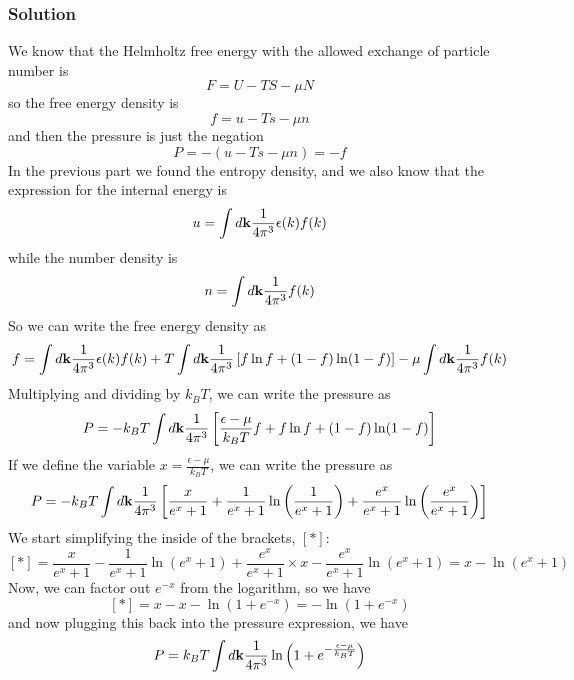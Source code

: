 \documentclass[12pt]{article}
\begin{document}
\subsubsection{Solution}
We know that the Helmholtz free energy with the allowed exchange of particle number is
\begin{equation}
    F = U - TS - \mu N
\end{equation}
so the free energy density is
\begin{equation}
    f = u - Ts - \mu n
\end{equation}
and then the pressure is just the negation
\begin{equation}
    P = -\left( u - Ts - \mu n \right) = -f
\end{equation}
In the previous part we found the entropy density, and we also know that the expression for the internal energy is
\begin{equation}
    u = \int d \vb{k} \frac{1}{4\pi^3} \epsilon(k) f(k)
\end{equation}
while the number density is
\begin{equation}
    n = \int d \vb{k} \frac{1}{4\pi^3} f(k)
\end{equation}
So we can write the free energy density as
\begin{equation}
    f = \int d \vb{k} \frac{1}{4\pi^3} \epsilon(k) f(k) + T \int d \vb{k} \frac{1}{4\pi^3} \left[ f \ln f + (1 - f) \ln (1 - f) \right] - \mu \int d \vb{k} \frac{1}{4\pi^3} f(k)
\end{equation}
Multiplying and dividing by \( k_B T \), we can write the pressure as
\begin{equation}
    P = -k_B T \int d \vb{k} \frac{1}{4\pi^3} \left[ \frac{\epsilon - \mu}{k_B T} f + f \ln f + (1 - f) \ln (1 - f) \right]
\end{equation}
If we define the variable \( x = \frac{\epsilon - \mu}{k_B T} \), we can write the pressure as
\begin{equation}
    P = -k_B T \int d \vb{k} \frac{1}{4\pi^3} \left[ \frac{x}{e^x + 1} + \frac{1}{e^x + 1} \ln \left( \frac{1}{e^x + 1} \right) + \frac{e^x}{e^x + 1} \ln \left( \frac{e^x}{e^x + 1} \right) \right]
\end{equation}
We start simplifying the inside of the brackets, \( \left[*\right] \):
\begin{equation}
    \left[*\right] = \frac{x}{e^x + 1} - \frac{1}{e^x + 1} \ln \left( e^x + 1 \right) + \frac{e^x}{e^x + 1} \times x - \frac{e^x}{e^x + 1} \ln \left( e^x + 1 \right) = x - \ln \left( e^x + 1 \right)
\end{equation}
Now, we can factor out \( e^{-x} \) from the logarithm, so we have
\begin{equation}
    \left[*\right] = x - x - \ln \left( 1 + e^{-x} \right) = -\ln \left( 1 + e^{-x} \right)
\end{equation}
and now plugging this back into the pressure expression, we have
\begin{equation}
    P = k_B T \int d \vb{k} \frac{1}{4\pi^3} \ln \left( 1 + e^{-\frac{\epsilon - \mu}{k_B T}} \right)
\end{equation}
\end{document}
